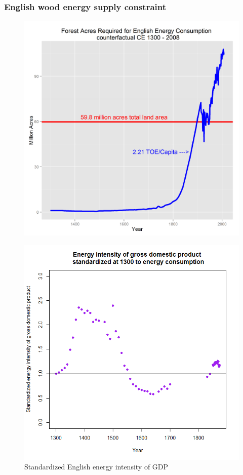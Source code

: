\documentclass[final]{beamer}
\begin{document}
\begin{frame}
\frametitle{English wood energy supply constraint}
\begin{figure}[p!]
\center
\label{fig:wood}
\includegraphics[height=0.8\textheight]{wood}
\end{figure}
\end{frame}

\begin{frame}
\begin{figure}[p!]
\center
\caption{Standardized English energy intensity of GDP}
\label{fig:energyIntensity}
\includegraphics[height=0.8\textheight]{energyIntensity}
\end{figure}
\end{frame}
\end{document}
